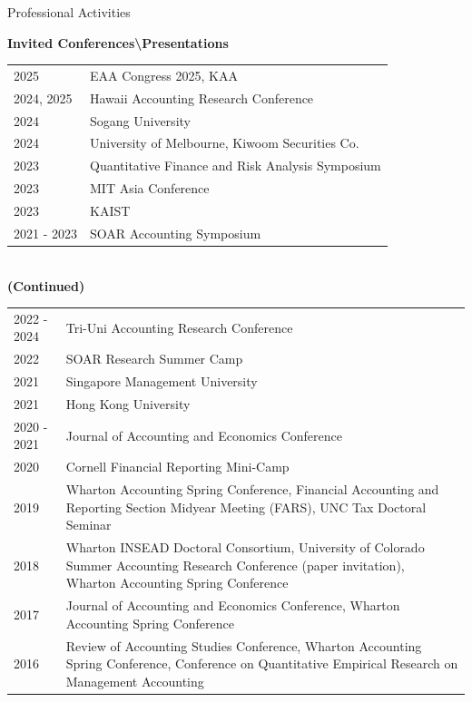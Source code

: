 \documentclass{resume} %
\begin{document}
\begin{rSection}{Professional Activities}

{\bf Invited Conferences\textbackslash Presentations} \medskip \\
\begin{tabular}{p{2cm}p{15.5cm}}
2025 & EAA Congress 2025, KAA  \medskip \\
2024, 2025 & Hawaii Accounting Research Conference  \medskip \\
2024 & Sogang University  \medskip \\
2024 & University of Melbourne, Kiwoom Securities Co. \medskip \\
2023 & Quantitative Finance and Risk Analysis Symposium \medskip \\
2023 & MIT Asia Conference \medskip \\
2023 & KAIST \medskip \\
2021 - 2023 & SOAR Accounting Symposium \medskip \\


\end{tabular} \\
{\bf (Continued)} \medskip \\
\begin{tabular}{p{2cm}p{15.5cm}}
2022 - 2024 & Tri-Uni Accounting Research Conference \medskip \\
2022 & SOAR Research Summer Camp \medskip \\
2021 & Singapore Management University \medskip \\
2021 & Hong Kong University \medskip \\
2020 - 2021 & Journal of Accounting and Economics Conference \medskip \\
2020 & Cornell Financial Reporting Mini-Camp \medskip \\
2019 & Wharton Accounting Spring Conference, Financial Accounting and Reporting Section Midyear Meeting (FARS), UNC Tax Doctoral Seminar \medskip \\
2018 & Wharton INSEAD Doctoral Consortium, University of Colorado Summer Accounting Research Conference (paper invitation), Wharton Accounting Spring Conference \medskip \\
2017 & Journal of Accounting and Economics Conference, Wharton Accounting Spring Conference  \medskip \\
2016 & Review of Accounting Studies Conference, Wharton Accounting Spring Conference, Conference on Quantitative Empirical Research on Management Accounting
\end{tabular}


\end{rSection}
\end{document}
